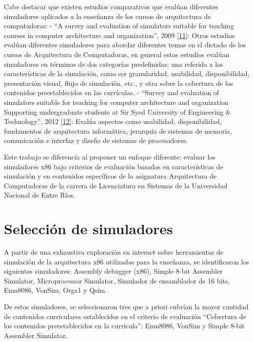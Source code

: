 \documentclass[12pt,twoside]{templates/unerthesis}
\begin{document}
Cabe destacar que existen estudios comparativos que evalúan diferentes simuladores aplicados a la enseñanza de los cursos de arquitectura de computadoras:
- ``A survey and evaluation of simulators suitable for teaching courses in computer architecture and organization'', 2009 {[}\protect\hyperlink{ref-nikolic_survey_2009}{11}{]}: Otros estudios evalúan diferentes simuladores para abordar diferentes temas en el dictado de los cursos de Arquitectura de Computadoras, en general estos estudios evalúan simuladores en términos de dos categorías predefinidas: una referida a las características de la simulación, como ser granularidad, usabilidad, disponibilidad, presentación visual, flujo de simulación, etc., y otra sobre la cobertura de los contenidos preestablecidos en las currículas.
- ``Survey and evaluation of simulators suitable for teaching for computer architecture and organization Supporting undergraduate students at Sir Syed University of Engineering \& Technology'', 2012 {[}\protect\hyperlink{ref-hasan_survey_2012}{12}{]}: Evalúa aspectos como usabilidad, disponibilidad, fundamentos de arquitectura informática, jerarquía de sistemas de memoria, comunicación e interfaz y diseño de sistemas de procesadores.

Este trabajo se diferencia al proponer un enfoque diferente: evaluar los simuladores x86 bajo criterios de evaluación basados en características de simulación y en contenidos específicos de la asignatura Arquitectura de Computadoras de la carrera de Licenciatura en Sistemas de la Universidad Nacional de Entre Ríos.

\hypertarget{selecciuxf3n-de-simuladores}{%
\section{Selección de simuladores}\label{selecciuxf3n-de-simuladores}}

A partir de una exhaustiva exploración en internet sobre herramientas de simulación de la arquitectura x86 utilizadas para la enseñanza, se identificaron los siguientes simuladores: Assembly debugger (x86), Simple 8-bit Assembler Simulator, Microprocessor Simulator, Simulador de ensamblador de 16 bits, Emu8086, VonSim, Orga1 y Qsim.

De estos simuladores, se seleccionaron tres que a priori cubrían la mayor cantidad de contenidos curriculares establecidos en el criterio de evaluación ``Cobertura de los contenidos preestablecidos en la currícula'': Emu8086, VonSim y Simple 8-bit Assembler Simulator.
\end{document}
